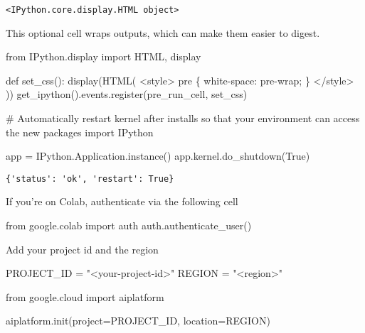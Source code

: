 \documentclass[
  letterpaper,
  DIV=11,
  numbers=noendperiod]{scrreprt}
\newenvironment{Shaded}{\begin{snugshade}}{\end{snugshade}}
\newcommand{\CommentTok}[1]{\textcolor[rgb]{0.37,0.37,0.37}{#1}}
\newcommand{\ImportTok}[1]{\textcolor[rgb]{0.00,0.46,0.62}{#1}}
\newcommand{\KeywordTok}[1]{\textcolor[rgb]{0.00,0.23,0.31}{#1}}
\newcommand{\NormalTok}[1]{\textcolor[rgb]{0.00,0.23,0.31}{#1}}
\newcommand{\OperatorTok}[1]{\textcolor[rgb]{0.37,0.37,0.37}{#1}}
\newcommand{\StringTok}[1]{\textcolor[rgb]{0.13,0.47,0.30}{#1}}
\newcommand{\VariableTok}[1]{\textcolor[rgb]{0.07,0.07,0.07}{#1}}
\begin{document}
\begin{verbatim}
<IPython.core.display.HTML object>
\end{verbatim}

This optional cell wraps outputs, which can make them easier to digest.

\begin{Shaded}
\begin{Highlighting}[]
\ImportTok{from}\NormalTok{ IPython.display }\ImportTok{import}\NormalTok{ HTML, display}

\KeywordTok{def}\NormalTok{ set\_css():}
\NormalTok{  display(HTML(}\StringTok{\textquotesingle{}\textquotesingle{}\textquotesingle{}}
\StringTok{  \textless{}style\textgreater{}}
\StringTok{    pre \{}
\StringTok{        white{-}space: pre{-}wrap;}
\StringTok{    \}}
\StringTok{  \textless{}/style\textgreater{}}
\StringTok{  \textquotesingle{}\textquotesingle{}\textquotesingle{}}\NormalTok{))}
\NormalTok{get\_ipython().events.register(}\StringTok{\textquotesingle{}pre\_run\_cell\textquotesingle{}}\NormalTok{, set\_css)}
\end{Highlighting}
\end{Shaded}

\begin{Shaded}
\begin{Highlighting}[]
\CommentTok{\# Automatically restart kernel after installs so that your environment can access the new packages}
\ImportTok{import}\NormalTok{ IPython}

\NormalTok{app }\OperatorTok{=}\NormalTok{ IPython.Application.instance()}
\NormalTok{app.kernel.do\_shutdown(}\VariableTok{True}\NormalTok{)}
\end{Highlighting}
\end{Shaded}

\begin{verbatim}
{'status': 'ok', 'restart': True}
\end{verbatim}

If you're on Colab, authenticate via the following cell

\begin{Shaded}
\begin{Highlighting}[]
\ImportTok{from}\NormalTok{ google.colab }\ImportTok{import}\NormalTok{ auth}
\NormalTok{auth.authenticate\_user()}
\end{Highlighting}
\end{Shaded}

Add your project id and the region

\begin{Shaded}
\begin{Highlighting}[]
\NormalTok{PROJECT\_ID }\OperatorTok{=} \StringTok{"\textless{}your{-}project{-}id\textgreater{}"}
\NormalTok{REGION }\OperatorTok{=} \StringTok{"\textless{}region\textgreater{}"}

\ImportTok{from}\NormalTok{ google.cloud }\ImportTok{import}\NormalTok{ aiplatform}

\NormalTok{aiplatform.init(project}\OperatorTok{=}\NormalTok{PROJECT\_ID, location}\OperatorTok{=}\NormalTok{REGION)}
\end{Highlighting}
\end{Shaded}
\end{document}
